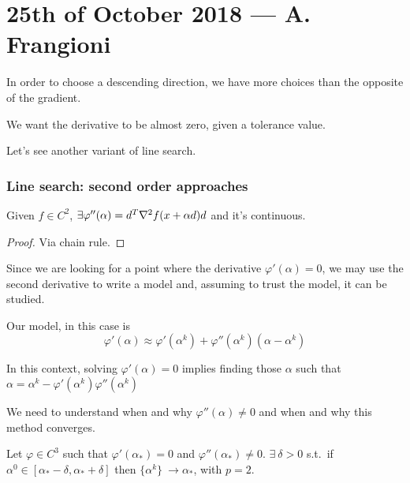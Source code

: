 \documentclass[computational_mathematics.tex]{subfiles}
\begin{document}
\section{25th of October 2018 --- A. Frangioni}

In order to choose a descending direction, we have more choices than the opposite of the gradient.

We want the derivative to be almost zero, given a tolerance value. 

Let's see another variant of line search.

\subsubsection{Line search: second order approaches}

\begin{theorem}
  Given $f \in C^2$,  $\exists \varphi''(\alpha) = {d}^{T} \nabla^{2} f(x + \alpha d ) d$ and it's continuous.
\end{theorem}
\begin{proof}
Via chain rule.
\end{proof}

Since we are looking for a point where the derivative $\varphi'(\alpha) = 0$, we may use the second derivative to write a model and, assuming to trust the model, it can be studied.

\begin{definition}
Our model, in this case is
  \[
    \varphi'(\alpha) \approx \varphi'(\alpha^k) + \varphi''(\alpha^k)(\alpha - \alpha^k)
  \]
\end{definition}

In this context, solving $\varphi'(\alpha) = 0$ implies finding those $\alpha$ such that $\alpha = \alpha^k - \varphi'(\alpha^k) \varphi''(\alpha^k)$ 


We need to understand when and why $\varphi''(\alpha) \ne 0$ and when and why this method converges.
\begin{theorem}
Let $\varphi \in C^{3}$ such that $\varphi'(\alpha_*) = 0$ and $\varphi''(\alpha_*) \neq 0$. $\exists~\delta > 0$ s.t.~if $\alpha^0 \in [\alpha_* - \delta, \alpha_* + \delta]$ then $\{\alpha^k \}~\to \alpha_*$, with $p = 2$.
\end{theorem}
\end{document}
